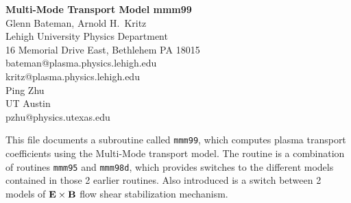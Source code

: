 %

\headheight 0pt \headsep 0pt  \topmargin 0pt  \oddsidemargin 0pt
\textheight 9.0in \textwidth 6.5in

\begin{center}
\Large {\bf Multi-Mode Transport Model mmm99} \\
\vspace{1pc} \normalsize
Glenn Bateman, Arnold H.~Kritz \\
 Lehigh University Physics Department \\
16 Memorial Drive East, Bethlehem PA 18015 \\
bateman@plasma.physics.lehigh.edu \\
kritz@plasma.physics.lehigh.edu \\
Ping Zhu \\
UT Austin \\
pzhu@physics.utexas.edu
\end{center}

This file documents a subroutine called {\tt mmm99}, which computes
plasma transport coefficients using the Multi-Mode transport model. The routine is a combination of routines {\tt mmm95} and {\tt mmm98d}, which provides switches to the different models contained in those 2 earlier routines. Also introduced is a switch between 2 models of ${\bf E}\times{\bf B}$ flow shear stabilization mechanism.


